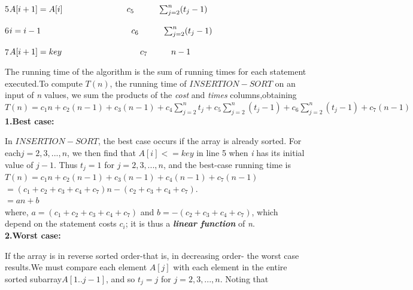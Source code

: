 \documentclass[9 pt]{report}
\begin{document}
5\hspace{2cm}$A[i+1]=A[i]\hspace{2.7cm}c_5\hspace{1cm}\sum_{j=2}^n(t_j-1)$

6\hspace{2cm}$i=i-1\hspace{3.8cm}c_6\hspace{1cm}\sum_{j=2}^n(t_j-1)$

7\hspace{1.5cm}$A[i+1]=key\hspace{3.3cm}c_7\hspace{1cm}n-1$


\vspace{1.5cm}



The running time of the algorithm is the sum of running times for each statement executed.To compute $T(n)$, the  running time of $INSERTION-SORT$ on an input of \textit{n} values, we sum the products of the \textit{cost} and \textit{times} columns,obtaining\\

$T(n)=c_1n+c_2(n-1)+c_3(n-1)+c_4\sum_{j=2}^nt_j + c_5\sum_{j=2}^n(t_j-1)+ c_6\sum_{j=2}^n(t_j-1) + c_7(n-1)$\\

\textbf{1.Best case:}

In $INSERTION-SORT$, the best case occurs if the array is already sorted. For each$ j=2,3,...,n$, we then find that $A[i]<=key$ in line 5 when \textit{i} has its initial value of $j-1$. Thus $t_j=1$ for $ j=2,3,...,n$, and the best-case running time is\\

$T(n)=c_1n+c_2(n-1)+c_3(n-1)+c_4(n-1) + c_7(n-1)$\\

\hspace{1cm}$=(c_1+c_2+c_3+c_4+c_7)n-(c_2+c_3+c_4+c_7).$\\

\hspace{1cm}$=an+b$\\

where, $a=(c_1+c_2+c_3+c_4+c_7)$ and $b=-(c_2+c_3+c_4+c_7)$, which depend on the statement costs $c_i$; it is thus a \textbf{\textit{linear function}} of \textit{n}.\\


\textbf{2.Worst case:}

If the array is in reverse sorted order-that is, in decreasing order- the worst case results.We must compare each element $A[j]$ with each element in the entire sorted subarray$A[1..j-1]$, and so $t_j=j$ for $j=2,3,...,n$. Noting that \\
\end{document}
